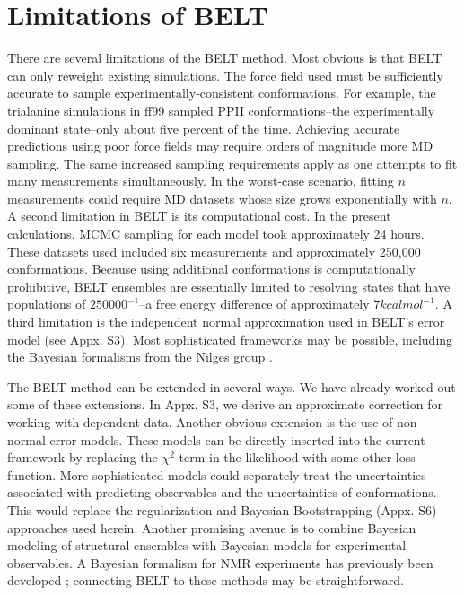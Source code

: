 \documentclass[11pt,titlepage]{article}
\begin{document}
\section*{Limitations of BELT}

There are several limitations of the BELT method.  Most obvious is that BELT can only reweight existing simulations.  The force field used must be sufficiently accurate to sample experimentally-consistent conformations.  For example, the trialanine simulations in ff99 sampled PPII conformations--the experimentally dominant state--only about five percent of the time.  Achieving accurate predictions using poor force fields may require orders of magnitude more MD sampling.  The same increased sampling requirements apply as one attempts to fit many measurements simultaneously.  In the worst-case scenario, fitting $n$ measurements could require MD datasets whose size grows exponentially with $n$.  A second limitation in BELT is its computational cost.  In the present calculations, MCMC sampling for each model took approximately 24 hours.  These datasets used included six measurements and approximately 250,000 conformations.  Because using additional conformations is computationally prohibitive, BELT ensembles are essentially limited to resolving states that have populations of $250000^{-1}$--a free energy difference of approximately $7 kcal mol^{-1}$.  A third limitation is the independent normal approximation used in BELT's error model (see Appx. S3).  Most sophisticated frameworks may be possible, including the Bayesian formalisms from the Nilges group \citep{rieping2005, habeck2006, habeck2005bayesian}.  


The BELT method can be extended in several ways.  We have already worked out some of these extensions.  In Appx. S3, we derive an approximate correction for working with dependent data.  Another obvious extension is the use of non-normal error models.  These models can be directly inserted into the current framework by replacing the $\chi^2$ term in the likelihood with some other loss function.  More sophisticated models could separately treat the uncertainties associated with predicting observables and the uncertainties of conformations.  This would replace the regularization and Bayesian Bootstrapping (Appx. S6) approaches used herein.  Another promising avenue is to combine Bayesian modeling of structural ensembles with Bayesian models for experimental observables.  A Bayesian formalism for NMR experiments has previously been developed  \citep{rieping2005, habeck2006, habeck2005bayesian}; connecting BELT to these methods may be straightforward.  
\end{document}
